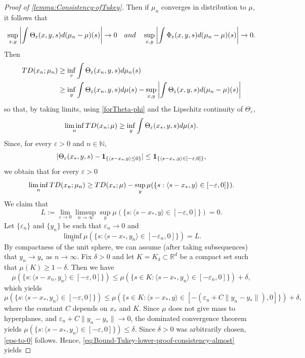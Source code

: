 \documentclass[11pt]{article}
\newcommand{\R}{\mathbb{R}}
\newcommand{\N}{\mathbb{N}}
\newcommand{\eps}{\varepsilon}
\theoremstyle{plain}
\theoremstyle{definition}
\begin{document}
{\begin{proof}[Proof of \autoref{lemma:Consistency-ofTukey}]
Then if $\mu_n$ converges in distribution to $\mu$, it follows that 
%
\begin{equation}
    \label{forTheta-phi}
     \sup_{x,y} \left| \int \Theta_\eps(x,y,s)d(\mu_n-\mu)(s) \right| \to 0 \quad {\rm and} \quad \sup_{x,y} \left| \int \Phi_\eps(x,y,s)d(\mu_n-\mu)(s) \right|\to 0. 
\end{equation}
%
Then 
%
\begin{align*}
    {\rm TD}(x_n; \mu_n) &\geq \inf_{v} \int \Theta_\eps(x_n,y,s) d \mu_n(s)\\
    &\geq \inf_{y} \int \Theta_\eps(x_n,y,s) d \mu(s)-  \sup_{x,y} \left|\int \Theta_\eps(x,y,s) d (\mu_n-\mu)(s)\right|
\end{align*}
%
so that, by taking limits, using \eqref{forTheta-phi} and the Lipschitz continuity of $\Theta_\eps$,
$$ \liminf_{n} {\rm TD}(x_n; \mu) \geq    \inf_{y}  \int \Theta_\eps(x_*,y,s) d \mu(s) . $$
Since, for every $\eps> 0$ and $n\in \N$,  
%
$$ |\Theta_\eps(x_*,y,s)- {\bf 1}_{\{ \langle  s-x_*, y\rangle\leq 0\}} | \leq {\bf 1}_{\{ \langle  s-x_*, y\rangle \in [-\eps,0]\}}, $$
%
we obtain that for every $\eps>0$
\begin{equation}
    \label{eq:Bound-Tukey-lower-proof-consistency-almost}
    \liminf_{n}  {\rm TD}(x_n; \mu_n) \geq {\rm TD}(x_*; \mu)  -  \sup_{y}\mu(\{s: \langle  s-x_*, y\rangle \in [-\eps,0]\} ).
\end{equation}
We claim that 
%
\begin{equation}
    \label{eps-to-0}
 L:=  \lim_{
   \eps\to 0
   } \limsup_{n\to \infty} \sup_{y}\mu(\{s: \langle  s-x_*, y\rangle \in [-\eps,0]\} )=0.
\end{equation}
%
Let $\{\eps_n\}$ and $\{y_n\}$ be such that $\eps_n\to 0$ and 
%
$$ \liminf_n \mu(\{s: \langle  s-x_*, y_n\rangle \in [-\eps_n,0]\} ) =L. $$
%
By compactness of the unit sphere, we can assume (after taking subsequences) that $y_n\to y_*$ as $n\to \infty$. Fix $\delta>0$ and let $K=K_\delta\subset \R^d$ be a compact set such that $\mu(K)\geq 1-\delta$. Then we have 
%
$$ \mu(\{s: \langle  s-x_n, y_n\rangle \in [-\eps,0]\} )  \leq \mu(\{s\in K: \langle  s-x_*, y_n\rangle \in [-\eps_n,0]\} ) +\delta  ,$$
%
which yields 
%
$$ \mu(\{s: \langle  s-x_*, y_n\rangle \in [-\eps,0]\} )  \leq \mu(\{s\in K: \langle  s-x_*, y\rangle \in [-(\eps_n+C\|y_n-y_*\| ),0]\} ) +\delta ,$$
where the constant $C$ depends on $x_*$ and $K$. Since $ \mu$ does not give mass to hyperplanes, and 
$\eps_n+C\|y_n-y_*\| \to 0$, 
the dominated convergence theorem yields 
$ \mu(\{s: \langle  s-x_*, y_n\rangle \in [-\eps,0]\} )  \leq \delta .$  Since $\delta>0$ was arbitrarily chosen, \eqref{eps-to-0} follows. Hence, \eqref{eq:Bound-Tukey-lower-proof-consistency-almost} yields 

\end{proof}}
\end{document}
